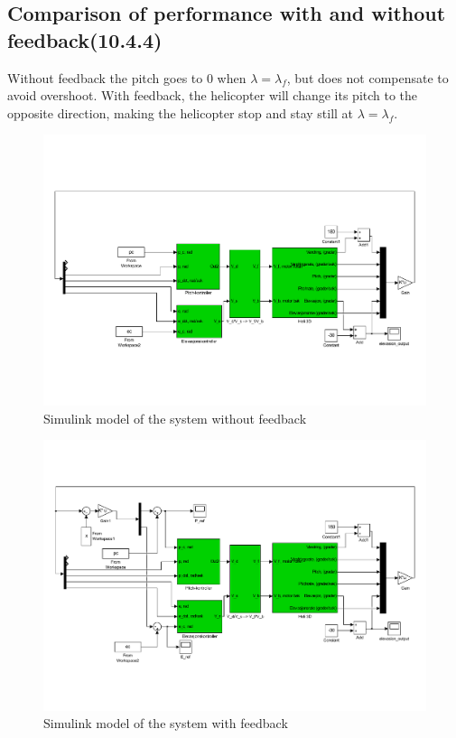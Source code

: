 \subsection{Comparison of performance with and without feedback(10.4.4)}
Without feedback the pitch goes to 0 when $\lambda = \lambda_f$, but does not compensate to avoid overshoot. With feedback, the helicopter will change its pitch to the opposite direction, making the helicopter stop and stay still at $\lambda = \lambda_f$. 

\begin{figure}[H]
	\centering
	\includegraphics[width=\textwidth, trim=2cm 5cm 2cm 2cm]{simulinkmodels/heldag4UnFeed}
	\caption{Simulink model of the system without feedback}
	\label{fig:heldag4UnFeed}
\end{figure}

\begin{figure}[H]
	\centering
	\includegraphics[width=\textwidth, trim=2cm 4cm 2cm 2cm]{simulinkmodels/heldag4medFeed}
	\caption{Simulink model of the system with feedback}
	\label{fig:heldag4medFeed}
\end{figure}

